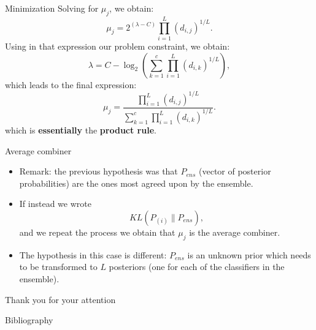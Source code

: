 \documentclass[xcolor=table]{beamer}
\begin{document}
\begin{frame}{Minimization}
    Solving for \(\mu_j\), we obtain:
    \[
    \mu_j = 2^{(\lambda - C)} \prod_{i=1}^L (d_{i,j})^{1/L}.
    \]
    Using in that expression our problem constraint, we obtain:
    \[
    \lambda = C - \log_2 \left(\sum_{k=1}^c \prod_{i=1}^L (d_{i,k})^{1/L}\right),
    \]
    \pause
    which leads to the final expression:
    \[
    \mu_j = \frac{\prod_{i=1}^L(d_{i,j})^{1/L}}{\sum_{k=1}^c \prod_{i=1}^L (d_{i,k})^{1/L}}.
    \]
    which is \textbf{essentially} the \textbf{product rule}.
\end{frame}

\begin{frame}{Average combiner}

\begin{itemize}
    \item Remark: the previous hypothesis was that \(P_{ens}\) (vector of posterior probabilities) are the ones most agreed upon by the ensemble.
    \pause
    \item If instead we wrote
    \[
    KL (P_{(i)} \parallel P_{ens}),
    \]
    and we repeat the process we obtain that \(\mu_j\) is the average combiner.
    \pause
    \item The hypothesis in this case is different: \(P_{ens}\) is an unknown prior which needs to be transformed to \(L\) posteriors (one for each of the classifiers in the ensemble).
    
\end{itemize}
    
\end{frame}

\begin{frame}{}
    \begin{center}
        Thank you for your attention
    \end{center}
\end{frame}




  \begin{frame}[noframenumbering]{Bibliography}

  
  

  \end{frame}
\end{document}
